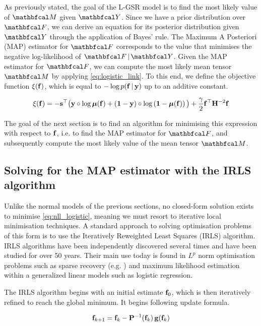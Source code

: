 As previously stated, the goal of the L-GSR model is to find the most likely value of $\Mt$ given $\Yt$. Since we have a prior distribution over $\Ft$, we can derive an equation for its posterior distribution given $\Yt$ through the application of Bayes' rule. The Maximum A Posteriori (MAP) estimator for $\Ft$ corresponds to the value that minimises the negative log-likelihood of $\Ft \, | \, \Yt$. Given the MAP estimator for $\Ft$, we can compute the most likely mean tensor $\Mt$ by applying \cref{eq:logistic_link}. To this end, we define the objective function $\xi(\mathbf{f})$, which is equal to $-\log p(\mathbf{f} \, | \, \mathbf{y})$ up to an additive constant.
 
\begin{equation}
    \label{eq:nll_logistic}
    \xi(\mathbf{f}) = -\mathbf{s}^\top \big(\mathbf{y} \circ \log \boldsymbol{\mu}(\mathbf{f}) + \left(\mathbf{1}  - \mathbf{y}\right) \circ \log \left(\mathbf{1} - \boldsymbol{\mu}(\mathbf{f}) \right)\big) + \frac{\gamma}{2} \mathbf{f}^\top \mathbf{H}^{-2} \mathbf{f}
\end{equation}

The goal of the next section is to find an algorithm for minimising this expression with respect to $\mathbf{f}$, i.e. to find the MAP estimator for $\Ft$, and subsequently compute the most likely value of the mean tensor $\Mt$. 


\subsection{Solving for the MAP estimator with the IRLS algorithm}

Unlike the normal models of the previous sections, no closed-form solution exists to minimise \cref{eq:nll_logistic}, meaning we must resort to iterative local minimisation techniques. A standard approach to solving optimisation problems of this form is to use the Iteratively Reweighted Least Squares (IRLS) algorithm. IRLS algorithms have been independently discovered several times and have been studied for over 50 years. Their main use today is found in $L^p$ norm optimisation problems such as sparse recovery (e.g. \cite{Gorodnitsky1997,Daubechies2010}) and maximum likelihood estimation within a generalized linear models \citep{Nelder1972} such as logistic regression. 

The IRLS algorithm begins with an initial estimate $\mathbf{f}_0$, which is then iteratively refined to reach the global minimum. It begins following update formula. 

\begin{equation}
    \label{eq:irls_update}
    \mathbf{f}_{k+1} = \mathbf{f}_{k} - \mathbf{P}^{-1}(\mathbf{f}_k) \, \mathbf{g}(\mathbf{f}_k)
\end{equation}

